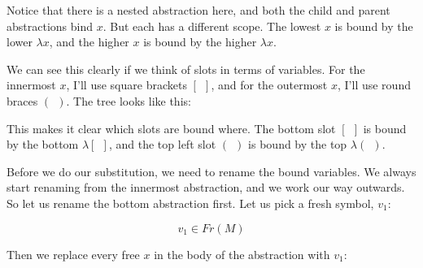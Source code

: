 \documentclass{book}
\numberwithin{equation}{chapter}
\begin{document}
\noindent
Notice that there is a nested abstraction here, and both the child and parent abstractions bind $x$. But each has a different scope. The lowest $x$ is bound by the lower $\lambda x$, and the higher $x$ is bound by the higher $\lambda x$.

We can see this clearly if we think of slots in terms of variables. For the innermost $x$, I'll use square brackets $[~~]$, and for the outermost $x$, I'll use round braces $(~~)$. The tree looks like this:

\begin{center}
\end{center}

\noindent
This makes it clear which slots are bound where. The bottom slot $[~~]$ is bound by the bottom $\lambda [~~]$, and the top left slot $(~~)$ is bound by the top $\lambda (~~)$.

Before we do our substitution, we need to rename the bound variables. We always start renaming from the innermost abstraction, and we work our way outwards. So let us rename the bottom abstraction first. Let us pick a fresh symbol, $v_{1}$:

\begin{equation}
v_{1} \in Fr(M)
\end{equation}

\noindent
Then we replace every free $x$ in the body of the abstraction with $v_{1}$:

\begin{center}
\end{center}
\end{document}
